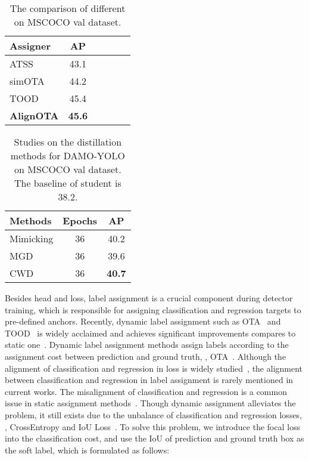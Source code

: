 \documentclass[10pt,twocolumn,letterpaper]{article}
\begin{document}
\begin{table}
    \begin{center}
    \caption{The comparison of different on MSCOCO val dataset. }
    \label{tab:label_assignment_comparison}
    \setlength{\tabcolsep}{3pt}
    \begin{tabular}{lccccc}
    \toprule
     Assigner & AP    \\
    \midrule 
    ATSS~\cite{zhu2020autoassign}  & 43.1    \\
simOTA~\cite{ge2021ota}   & 44.2    \\
    TOOD~\cite{tood}  &  45.4      \\
    \textbf{AlignOTA}  &  \textbf{45.6}      \\
    \bottomrule
    \end{tabular}
    \end{center}
\end{table}
\begin{table}
    \begin{center}
    \caption{Studies on the distillation methods for DAMO-YOLO on MSCOCO val dataset. The baseline of student is 38.2.}
    \label{tab:distill}
 \setlength{\tabcolsep}{3pt}
    \begin{tabular}{lcc}
    \toprule
     Methods & Epochs & AP    \\
    \midrule 
    Mimicking \cite{li2017mimicking} & 36  & 40.2     \\
    MGD \cite{yang2022masked} & 36  & 39.6   \\
    CWD \cite{shu2021channel} & 36 &  \textbf{40.7}  \\
    \bottomrule
    \end{tabular}
    \end{center}
\end{table}
Besides head and loss, label assignment is a crucial component during detector training, which is responsible for assigning classification and regression targets to pre-defined anchors. 
Recently, dynamic label assignment such as OTA~\cite{ge2021ota} and TOOD~\cite{tood} is widely acclaimed and achieves significant improvements compares to static one~\cite{zhu2020autoassign}. 
Dynamic label assignment methods assign labels according to the assignment cost between prediction and ground truth, \eg, OTA~\cite{ge2021ota}. Although the alignment of classification and regression in loss is widely studied~\cite{tood,li2020generalized}, the alignment between classification and regression in label assignment is rarely mentioned in current works. 
The misalignment of classification and regression is a common issue in static assignment methods~\cite{zhu2020autoassign}. Though dynamic assignment alleviates the problem, it still exists due to the unbalance of classification and regression losses, \eg, CrossEntropy and IoU Loss~\cite{yu2016unitbox}. 
To solve this problem, 
we introduce the focal loss~\cite{lin2017focal} into the classification cost, and use the IoU of prediction and ground truth box as the soft label, which is formulated as follows:
\end{document}
